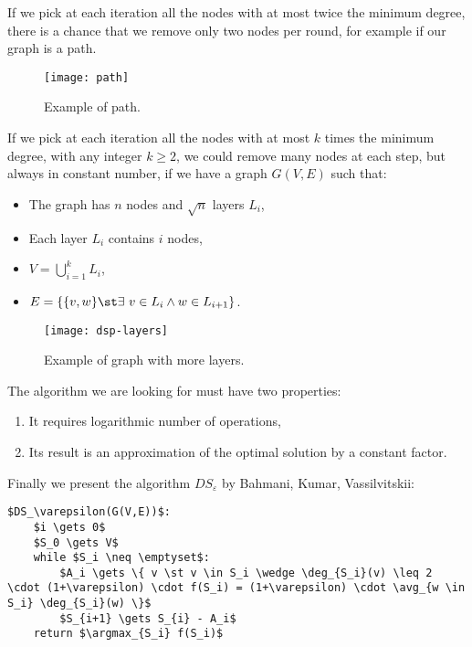 \begin{ex}
    If we pick at each iteration all the nodes with at most twice the minimum degree, there is a chance that we remove only two nodes per round, for example if our graph is a path.
    \begin{figure}[h!]
        \centering
        \texttt{[image: path]}
        \caption{Example of path.}
        \label{fig:dsp-path}
    \end{figure}
\end{ex}


\begin{ex}
    If we pick at each iteration all the nodes with at most $k$ times the minimum degree, with any integer $k \geq 2$, we could remove many nodes at each step, but always in constant number, if we have a graph $G(V,E)$ such that:
    \begin{itemize}
        \item The graph has $n$ nodes and $\sqrt{n}$ layers $L_i$,
        \item Each layer $L_i$ contains $i$ nodes,
        \item $V = \bigcup_{i=1}^k L_i$,
        \item $E = \{ \{v,w\} \st \exists\ v \in L_i \wedge w \in L_{i+1} \}$.
    \end{itemize}
    \begin{figure}[h!]
        \centering
        \texttt{[image: dsp-layers]}
        \caption{Example of graph with more layers.}
        \label{fig:dsp-layers}
    \end{figure}
\end{ex}

\begin{obs}
    The algorithm we are looking for must have two properties:
    \begin{enumerate}
        \item It requires logarithmic number of operations,
        \item Its result is an approximation of the optimal solution by a constant factor.
    \end{enumerate}
\end{obs}

Finally we present the algorithm $DS_\varepsilon$ by Bahmani, Kumar, Vassilvitskii:
\begin{lstlisting}[caption={The $DS_\varepsilon$ algorithm to solve the densest subgraph problem},label={lst:dsp-dse}]
$DS_\varepsilon(G(V,E))$:
    $i \gets 0$
    $S_0 \gets V$
    while $S_i \neq \emptyset$:
        $A_i \gets \{ v \st v \in S_i \wedge \deg_{S_i}(v) \leq 2 \cdot (1+\varepsilon) \cdot f(S_i) = (1+\varepsilon) \cdot \avg_{w \in S_i} \deg_{S_i}(w) \}$
        $S_{i+1} \gets S_{i} - A_i$
    return $\argmax_{S_i} f(S_i)$
\end{lstlisting}


